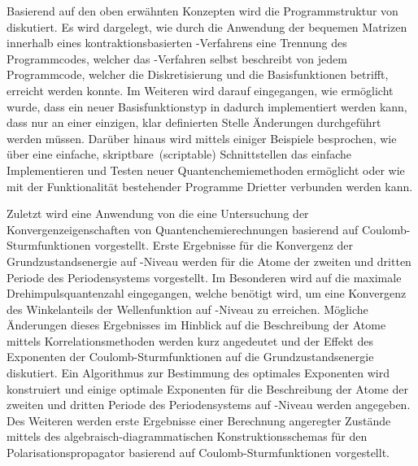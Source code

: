Basierend auf den oben erwähnten Konzepten wird die Programmstruktur
von \molsturm diskutiert.
Es wird dargelegt, wie durch die Anwendung der bequemen Matrizen
innerhalb eines kontraktionsbasierten \SCF-Verfahrens
eine Trennung des Programmcodes,
welcher das \SCF-Verfahren selbst beschreibt
von jedem Programmcode, welcher die Diskretisierung und die Basisfunktionen betrifft,
erreicht werden konnte.
Im Weiteren wird darauf eingegangen,
wie ermöglicht wurde, dass ein neuer Basisfunktionstyp
in \molsturm dadurch implementiert werden kann,
dass nur an einer einzigen, klar definierten Stelle
Änderungen durchgeführt werden müssen.
Darüber hinaus wird mittels einiger Beispiele besprochen,
wie \molsturm über eine einfache, skriptbare~(scriptable) Schnittstellen
das einfache Implementieren und Testen neuer Quantenchemiemethoden
ermöglicht oder wie \molsturm mit der Funktionalität
bestehender Programme Drietter verbunden werden kann.

Zuletzt wird eine Anwendung von \molsturm
die eine Untersuchung der Konvergenzeigenschaften
von Quantenchemierechnungen basierend auf Coulomb-Sturmfunktionen vorgestellt.
Erste Ergebnisse für die Konvergenz der Grundzustandsenergie auf \HF-Niveau
werden für die Atome der zweiten und dritten Periode des Periodensystems vorgestellt.
Im Besonderen wird auf die maximale Drehimpulsquantenzahl eingegangen,
welche benötigt wird,
um eine Konvergenz des Winkelanteils der Wellenfunktion
auf \HF-Niveau zu erreichen.
Mögliche Änderungen dieses Ergebnisses im Hinblick auf die Beschreibung
der Atome mittels Korrelationsmethoden werden kurz angedeutet
und der Effekt des Exponenten der Coulomb-Sturmfunktionen
auf die Grundzustandsenergie diskutiert.
Ein Algorithmus zur Bestimmung des optimales Exponenten wird konstruiert
und einige optimale Exponenten für die Beschreibung der Atome
der zweiten und dritten Periode des Periodensystems
auf \HF-Niveau werden angegeben.
Des Weiteren werden erste Ergebnisse einer Berechnung angeregter Zustände
mittels des algebraisch-diagrammatischen Konstruktionsschemas
für den Polarisationspropagator basierend auf Coulomb-Sturmfunktionen vorgestellt.
